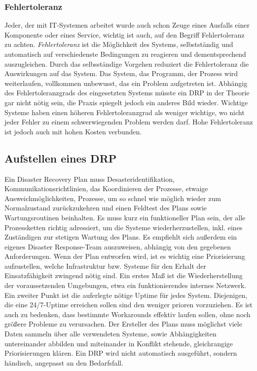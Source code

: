 \documentclass[letterpaper, 12pt]{article}
\let\tempsubsection\subsection
\renewcommand\subsection[1]{\vspace{0cm}\tempsubsection{#1}\vspace{0cm}}
\let\tempsubsubsection\subsubsection
\renewcommand\subsubsection[1]{\vspace{0cm}\tempsubsubsection{#1}\vspace{0cm}}
\begin{document}
\newpage

\subsubsection{Fehlertoleranz}

Jeder, der mit IT-Systemen arbeitet wurde auch schon Zeuge eines Ausfalls einer Komponente oder eines Service, wichtig ist auch, auf den Begriff Fehlertoleranz zu achten. \textit{Fehlertoleranz} ist die Möglichkeit des Systems, selbstständig und automatisch auf verschiedenste Bedingungen zu reagieren und dementsprechend auszugleichen. Durch das selbsständige Vorgehen reduziert die Fehlertoleranz die Auswirkungen auf das System. Das System, das Programm, der Prozess wird weiterlaufen, vollkommen unbewusst, das ein Problem aufgetreten ist. Abhängig des Fehlertoleranzgrads des eingesetzten Systems müsste ein DRP in der Theorie gar nicht nötig sein, die Praxis spiegelt jedoch ein anderes Bild wieder. Wichtige Systeme haben einen höheren Fehlertoleranzgrad als weniger wichtige, wo nicht jeder Fehler zu einem schwerwiegenden Problem werden darf. Hohe Fehlertoleranz ist jedoch auch mit hohen Kosten verbunden.

\subsection{Aufstellen eines DRP \cite{booktwo}}

Ein Disaster Recovery Plan muss Desasteridentifikation, Kommunikationsrichtlinien, 
das Koordinieren der Prozesse, etwaige Ausweichmöglichkeiten, Prozesse, um so schnel wie möglich wieder 
zum Normalzustand zurückzukehren und einen Feldtest des Plans sowie Wartungsroutinen beinhalten. 
Es muss kurz ein funktioneller Plan sein, der alle Prozessketten richtig adressiert, um die 
Systeme wiederherzustellen, inkl. eines Zuständigen zur stetigen Wartung des Plans.
Es empfiehlt sich außerdem ein eigenes Disaster Response-Team auszuweisen, abhängig von den
gegebenen Anforderungen. Wenn der Plan entworfen wird, ist es wichtig eine Priorisierung aufzustellen,
welche Infrastruktur bzw. Systeme für den Erhalt der Einsatzfähigkeit zwingend nötig sind. Ein erstes Maß
ist die Wiederherstellung der voraussetzenden Umgebungen, etwa ein funktionierendes internes Netzwerk. Ein 
zweiter Punkt ist die auferlegte nötige Uptime für jedes System. Diejenigen, die eine 24/7-Uptime erreichen sollen
sind den weniger prioren vorzuziehen.
Es ist auch zu bedenken, dass bestimmte Workarounds effektiv laufen sollen, ohne noch größere Probleme
zu verursachen. Der Ersteller des Plans muss möglichst viele Daten sammeln über alle verwendeten Systeme,
sowie Abhängigkeiten untereinander abbilden und miteinander in Konflikt stehende, gleichrangige Priorisierungen klären. Ein DRP wird nicht automatisch ausgeführt, sondern händisch, angepasst an den Bedarfsfall.  \\
\end{document}
